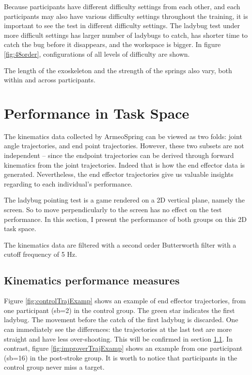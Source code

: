 Because participants have different difficulty settings from each other, and each participants may also have various difficulty settings throughout the training, it is important to see the test in different difficulty settings. The ladybug test under more difficult settings has larger number of ladybugs to catch, has shorter time to catch the bug before it disappears, and the workspace is bigger. In figure \ref{fig:48order}, configurations of all levels of difficulty are shown. 

The length of the exoskeleton and the strength of the springs also vary, both within and across participants.


\section{Performance in Task Space}

The kinematics data collected by ArmeoSpring can be viewed as two folds: joint angle trajectories, and end point trajectories. However, these two subsets are not independent -- since the endpoint trajectories can be derived through forward kinematics from the joint trajectories. Indeed that is how the end effector data is generated. Nevertheless, the end effector trajectories give us valuable insights regarding to each individual's performance.

The ladybug pointing test is a game rendered on a 2D vertical plane, namely the screen. So to move perpendicularly to the screen has no effect on the test performance. In this section, I present the performance of both groups on this 2D task space.

The kinematics data are filtered with a second order Butterworth filter with a cutoff frequency of 5 Hz.

\subsection{Kinematics performance measures}

Figure \ref{fig:controlTrajExamp} shows an example of end effector trajectories, from one participant (sb=2) in the control group. The green star indicates the first ladybug. The movement before the catch of the first ladybug is discarded. One can immediately see the differences: the trajectories at the last test are more straight and have less over-shooting. This will be confirmed in section \ref{}. In contrast, figure \ref{fig:improverTrajExamp} shows an example from one participant (sb=16) in the post-stroke group. It is worth to notice that participants in the control group never miss a target.

